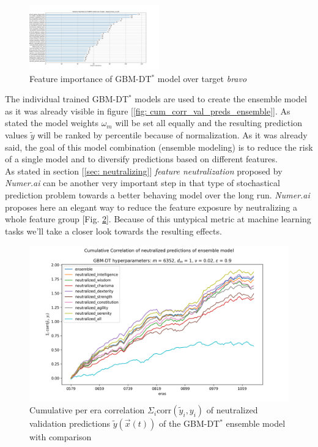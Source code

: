 \documentclass[12pt, a4paper]{article}
\begin{document}
\begin{figure}[!htpb]
    \centering
    \includegraphics[width=0.5\textwidth,trim={0 0 0 0},clip]{rounds/2024-01-17_round1_feature_importance_target_bravo_v4_20.png}
    \caption[Feature importance of model bravo]{Feature importance of GBM-DT$^{\ast}$ model over target \textit{bravo}}
    \label{fig: fi_bravo}
\end{figure}
The individual trained GBM-DT$^{\ast}$ models are used to create the ensemble model as it was already visible in figure [\ref{fig: cum_corr_val_preds_ensemble}]. As stated the model weights $\omega_m$ will be set all equally and the resulting prediction values $\tilde{y}$ will be ranked by percentile because of normalization. As it was already said, the goal of this model combination (ensemble modeling) is to reduce the risk of a single model and to diversify predictions based on different features. \\
As stated in section [\ref{sec: neutralizing}] \textit{feature neutralization} proposed by \textit{Numer.ai} can be another very important step in that type of stochastical prediction problem towards a better behaving model over the long run. \textit{Numer.ai} proposes here an elegant way to reduce the feature exposure by neutralizing a whole feature group [Fig. \ref{fig: cum_corr_val_preds_ensemble_neutral}]. Because of this untypical metric at machine learning tasks we'll take a closer look towards the resulting effects. \\
\begin{figure}[!htpb]
    \centering
    \includegraphics[width=1\textwidth,trim={0 0 0 0},clip]{rounds/2024-01-17_round1_cumulative_correlation_of_validation_predicitions_neutralization_ensemble.png}
    \caption[Cumulative per era correlation of neutralized predictions of the GBM-DT$^{\ast}$ ensemble model with comparison]{Cumulative per era correlation $\Sigma_i \text{corr}(\tilde{y}_i,y_i)$ of neutralized validation predictions $\tilde{y}(\vec{x}(t))$ of the GBM-DT$^{\ast}$ ensemble model with comparison}
    \label{fig: cum_corr_val_preds_ensemble_neutral}
\end{figure}
\end{document}
